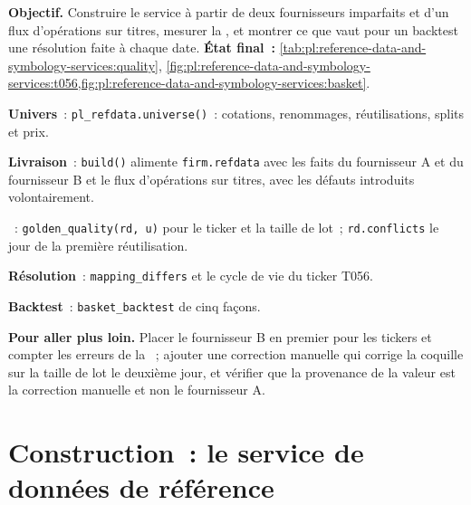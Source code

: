 \begin{tutorial}
\textbf{Objectif.} Construire le service à partir de deux fournisseurs imparfaits et d'un flux d'opérations sur titres, mesurer la , et montrer
ce que vaut pour un backtest une résolution faite à chaque date. \textbf{État final~:} \cref{tab:pl:reference-data-and-symbology-services:quality},
\cref{fig:pl:reference-data-and-symbology-services:t056,fig:pl:reference-data-and-symbology-services:basket}.
\begin{tutsteps}
\item \textbf{Univers}~: \texttt{pl\_refdata.universe()}~: cotations, renommages, réutilisations, splits et prix.
\item \textbf{Livraison}~: \texttt{build()} alimente \texttt{firm.refdata} avec les faits du fournisseur A et du fournisseur B et le flux d'opérations sur titres,
avec les défauts introduits volontairement.
\item \textbf{}~: \texttt{golden\_quality(rd, u)} pour le ticker et la taille de lot~; \texttt{rd.conflicts} le jour de la
première réutilisation.
\item \textbf{Résolution}~: \texttt{mapping\_differs} et le cycle de vie du ticker T056.
\item \textbf{Backtest}~: \texttt{basket\_backtest} de cinq façons.
\end{tutsteps}
\textbf{Pour aller plus loin.} Placer le fournisseur B en premier pour les tickers et compter les erreurs de la ~; ajouter une correction manuelle qui corrige
la coquille sur la taille de lot le deuxième jour, et vérifier que la provenance de la valeur est la correction manuelle et non le fournisseur A.
\end{tutorial}

\section{Construction~: le service de données de référence}\label{bld:pl:reference-data-and-symbology-services:refdata}

